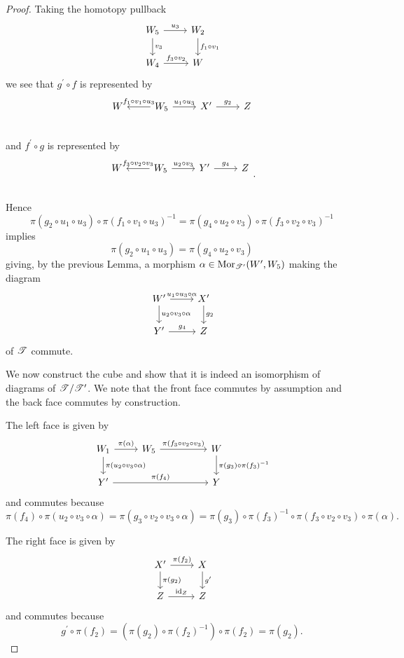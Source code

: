 \documentclass[dissertation.tex]{subfiles}
\begin{document}
\begin{lem}
\begin{proof}
    Taking the homotopy pullback
    $$\begin{tikzcd}
      W_5 \arrow{r}{u_3}\arrow{d}{v_3} & W_2\arrow{d}{f_1 \circ v_1}\\
      W_4 \arrow{r}{f_3 \circ v_2} & W
    \end{tikzcd}$$
    we see that $g^\prime \circ f$ is represented by
    $$\begin{tikzcd}
      W & W_5\arrow[swap]{l}{f_1 \circ v_1 \circ u_3}\arrow{r}{u_1 \circ u_3} & X^\prime \arrow{r}{g_2} & Z\\
    \end{tikzcd}$$
    and $f^\prime \circ g$ is represented by
    $$
    \begin{tikzcd}
      W & W_5 \arrow[swap]{l}{f_3 \circ v_2 \circ v_3}\arrow{r}{u_2 \circ v_3} & Y^\prime \arrow{r}{g_4} & Z\\
    \end{tikzcd}.$$
    Hence
    $$\pi(g_2 \circ u_1 \circ u_3)\circ\pi(f_1 \circ v_1 \circ u_3)^{-1} = \pi(g_4 \circ u_2 \circ v_3) \circ \pi(f_3 \circ v_2 \circ v_3)^{-1}$$
    implies
    $$\pi(g_2 \circ u_1 \circ u_3) =  \pi(g_4 \circ u_2 \circ v_3)$$
    giving, by the previous Lemma, a morphism $\alpha \in \operatorname{Mor}_{\mathscr{T}^\prime}(W^\prime, W_5)$ making the diagram
    $$\begin{tikzcd}
      W^\prime \arrow{r}{u_1 \circ u_3 \circ \alpha}\arrow{d}{u_2 \circ v_3 \circ \alpha} & X^\prime\arrow{d}{g_2}\\
      Y^\prime \arrow{r}{g_4} & Z
    \end{tikzcd}$$
    of $\mathscr{T}$ commute.
    
    We now construct the cube and show that it is indeed an isomorphism of diagrams of $\mathscr{T}/\mathscr{T}^\prime$.
    We note that the front face commutes by assumption and the back face commutes by construction.
    
    The left face is given by
    $$\begin{tikzcd}
      W_1 \arrow{r}{\pi(\alpha)}\arrow{d}{\pi(u_2 \circ v_3 \circ \alpha)} 
      & W_5 \arrow{rr}{\pi(f_3 \circ v_2 \circ v_3)} 
      & & W\arrow{d}{\pi(g_3)\circ\pi(f_3)^{-1}}\\
      Y^\prime \arrow{rrr}{\pi(f_4)} & & & Y
    \end{tikzcd}$$
    and commutes because
    $$\pi(f_4) \circ \pi(u_2 \circ v_3 \circ \alpha) = \pi(g_3 \circ v_2 \circ v_3 \circ \alpha) = \pi(g_3) \circ \pi(f_3)^{-1} \circ \pi(f_3 \circ v_2 \circ v_3) \circ \pi(\alpha).$$
    
    The right face is given by
    $$\begin{tikzcd}
      X^\prime \arrow{r}{\pi(f_2)}\arrow{d}{\pi(g_2)} & X\arrow{d}{g^\prime}\\
      Z \arrow{r}{\id_Z} & Z
    \end{tikzcd}$$
    and commutes because
    $$g^\prime \circ \pi(f_2) = \left(\pi(g_2) \circ \pi(f_2)^{-1}\right) \circ \pi(f_2) = \pi(g_2).$$


\end{proof}
\end{lem}
\end{document}
